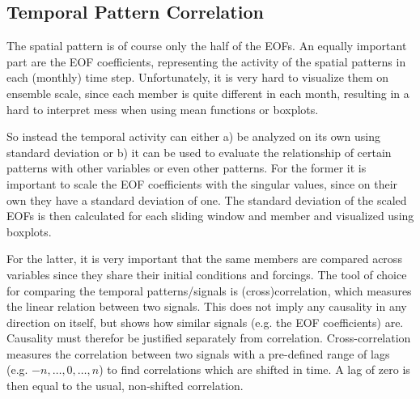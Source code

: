 

\subsection{Temporal Pattern Correlation} %
\label{sec:Temporal Pattern Correlation}

The spatial pattern is of course only the half of the EOFs. 
An equally important part are the EOF coefficients, representing the activity of the spatial patterns in each (monthly) time step. 
Unfortunately, it is very hard to visualize them on ensemble scale, since each member is quite different in each month, resulting in a hard to interpret mess when using mean functions or boxplots. 

So instead the temporal activity can either a) be analyzed on its own using standard deviation or b) it can be used to evaluate the relationship of certain patterns with other variables or even other patterns. 
For the former it is important to scale the EOF coefficients with the singular values, since on their own they have a standard deviation of one. 
The standard deviation of the scaled EOFs is then calculated for each sliding window and member and visualized using boxplots. 

For the latter, it is very important that the same members are compared across variables since they share their initial conditions and forcings.  
The tool of choice for comparing the temporal patterns/signals is (cross)correlation, which measures the linear relation between two signals. 
This does not imply any causality in any direction on itself, but shows how similar signals (e.g. the EOF coefficients) are. 
Causality must therefor be justified separately from correlation.  
Cross-correlation measures the correlation between two signals with a pre-defined range of lags (e.g. $-n,\dots,0,\dots,n$) to find correlations which are shifted in time. 
A lag of zero is then equal to the usual, non-shifted correlation. 

